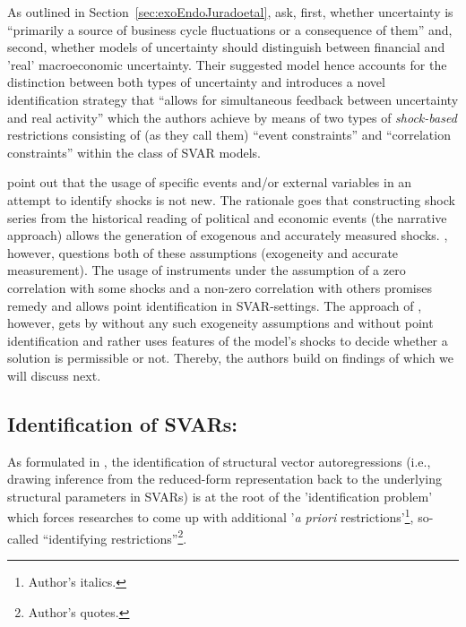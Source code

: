 \documentclass[a4paper,11pt,listof=nochaptergap,oneside,pointednumbers,bibtotoc,bigheadings,liststotoc]{scrbook}
\theoremstyle{mysatz}
\theoremstyle{mydefinition}
\theoremstyle{mytheorem}
\theoremstyle{mybemerkung}
\begin{document}
As outlined in Section~\ref{sec:exoEndoJuradoetal}, \citet[p. 2]{ludvigsonetal:18} ask, first, whether uncertainty is ``primarily a source of business cycle fluctuations or a consequence of them'' and, second, whether models of uncertainty should distinguish between financial and 'real' macroeconomic uncertainty. Their suggested model hence accounts for the distinction between both types of uncertainty and introduces a novel identification strategy that ``allows for simultaneous feedback between uncertainty and real activity'' which the authors achieve by means of two types of \textit{shock-based} restrictions consisting of (as they call them) ``event constraints'' and ``correlation constraints'' within the class of SVAR models. 

\citet{ludvigsonetal:18} point out that the usage of specific events and/or external variables in an attempt to identify shocks is not new. The rationale goes that constructing shock series from the historical reading of political and economic events (the narrative approach) allows the generation of exogenous and accurately measured shocks. \citet{ramey:16}, however, questions both of these assumptions (exogeneity and accurate measurement). The usage of instruments under the assumption of a zero correlation with some shocks and a non-zero correlation with others promises remedy and allows point identification in SVAR-settings. The approach of \citet{ludvigsonetal:18}, however, gets by without any such exogeneity assumptions and without point identification and rather uses features of the model's shocks to decide whether a solution is permissible or not. Thereby, the authors build on findings of \citet{rubioetal:10} which we will discuss next.

	
	
\subsection{Identification of SVARs: \citet{rubioetal:10}}
\label{sec:observationalEquivalence}
As formulated in \citet{rubioetal:10}, the identification of structural vector autoregressions (i.e., drawing inference from the reduced-form representation back to the underlying structural parameters in SVARs) is at the root of the 'identification problem' which forces researches to come up with additional '\textit{a priori} restrictions'\footnote{Author's italics.}, so-called ``identifying restrictions''\footnote{Author's quotes.}.
\end{document}
